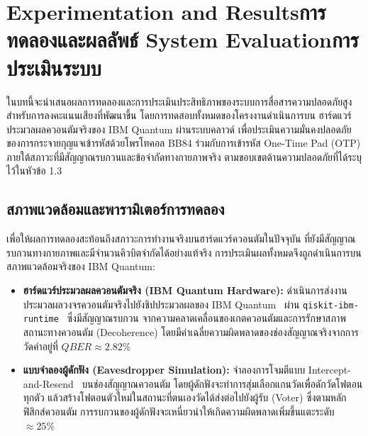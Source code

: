 \chapter{\ifproject%
\ifenglish Experimentation and Results\else การทดลองและผลลัพธ์\fi
\else%
\ifenglish System Evaluation\else การประเมินระบบ\fi
\fi}

ในบทนี้จะนำเสนอผลการทดลองและการประเมินประสิทธิภาพของระบบการสื่อสารความปลอดภัยสูงสำหรับการลงคะแนนเสียงที่พัฒนาขึ้น โดยการทดสอบทั้งหมดของโครงงานดำเนินการบน ฮาร์ดแวร์ประมวลผลควอนตัมจริงของ IBM Quantum ผ่านระบบคลาวด์ เพื่อประเมินความมั่นคงปลอดภัยของการกระจายกุญแจเข้ารหัสด้วยโพรโทคอล BB84 ร่วมกับการเข้ารหัส One-Time Pad (OTP) ภายใต้สภาวะที่มีสัญญาณรบกวนและข้อจำกัดทางกายภาพจริง ตามขอบเขตด้านความปลอดภัยที่ได้ระบุไว้ในหัวข้อ 1.3

\section{สภาพแวดล้อมและพารามิเตอร์การทดลอง}

เพื่อให้ผลการทดลองสะท้อนถึงสภาวะการทำงานจริงบนฮาร์ดแวร์ควอนตัมในปัจจุบัน ที่ยังมีสัญญาณรบกวนทางกายภาพและมีจำนวนคิวบิตจำกัดได้อย่างแท้จริง การประเมินผลทั้งหมดจึงถูกดำเนินการบนสภาพแวดล้อมจริงของ IBM Quantum:

\begin{itemize}
    \item \textbf{ฮาร์ดแวร์ประมวลผลควอนตัมจริง (IBM Quantum Hardware):} ดำเนินการส่งงานประมวลผลวงจรควอนตัมจริงไปยังชิปประมวลผลของ IBM Quantum~\cite{ibm_quantum_platform} ผ่าน \texttt{qiskit-ibm-runtime}~\cite{qiskit_ibm_runtime} ซึ่งมีสัญญาณรบกวน จากความคลาดเคลื่อนของเกตควอนตัมและการรักษาสภาพสถานะทางควอนตัม (Decoherence) โดยมีค่าเฉลี่ยความผิดพลาดของช่องสัญญาณจริงจากการวัดค่าอยู่ที่ $QBER \approx 2.82\%$
    \item \textbf{แบบจำลองผู้ดักฟัง (Eavesdropper Simulation):} จำลองการโจมตีแบบ Intercept-and-Resend~\cite{gisin_qkd_review} บนช่องสัญญาณควอนตัม โดยผู้ดักฟังจะทำการสุ่มเลือกแกนวัดเพื่อดักวัดโฟตอนทุกตัว แล้วสร้างโฟตอนตัวใหม่ในสถานะที่ตนเองวัดได้ส่งต่อไปยังผู้รับ (Voter) ซึ่งตามหลักฟิสิกส์ควอนตัม การรบกวนของผู้ดักฟังจะเหนี่ยวนำให้เกิดความผิดพลาดเพิ่มขึ้นแตะระดับ $\approx 25\%$
\end{itemize}


